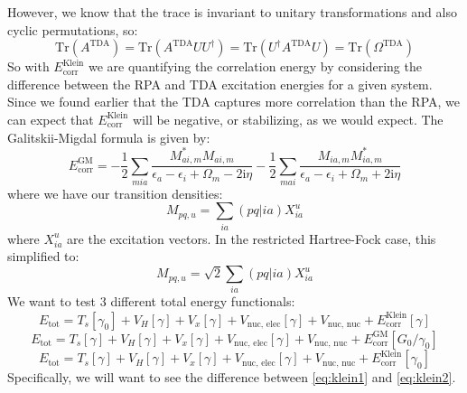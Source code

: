 \documentclass[12pt]{article}
\begin{document}
However, we know that the trace is invariant to unitary transformations and also cyclic permutations, so:
\begin{equation}
    \text{Tr} (A^{\text{TDA}}) = \text{Tr} (A^{\text{TDA}} UU^{\dagger}) = \text{Tr} (U^{\dagger} A^{\text{TDA}} U) = \text{Tr} (\Omega ^{\text{TDA}})
\end{equation}
So with $E_{\text{corr}}^{\text{Klein}}$ we are quantifying the correlation energy by considering the difference between the RPA and TDA excitation energies for a given system. Since we found earlier that the TDA captures more correlation than the RPA, we can expect that $E_{\text{corr}}^{\text{Klein}}$ will be negative, or stabilizing, as we would expect.
The Galitskii-Migdal formula is given by:
\begin{equation}
    E_{\text{corr}} ^{\text{GM}} =-\frac{1}{2} \sum_{m i a} \frac{M_{a i, m}^* M_{a i, m}}{\epsilon_a-\epsilon_i+\Omega_m-2 \mathrm{i} \eta}-\frac{1}{2} \sum_{m a i} \frac{M_{i a, m} M_{i a, m}^*}{\epsilon_a-\epsilon_i+\Omega_m+2 \mathrm{i} \eta}
\end{equation}
where we have our transition densities:
\begin{equation}
    M_{pq,u} = \sum_{ia} (pq|ia) X_{ia}^u
\end{equation}
where $X_{ia}^u$ are the excitation vectors. In the restricted Hartree-Fock case, this simplified to:
\begin{equation}
    M_{pq,u} = \sqrt{2} \sum_{ia} (pq|ia) X_{ia}^u
\end{equation}
We want to test 3 different total energy functionals:
\begin{equation}
    E_{\text{tot}} = T_s [\gamma _{0}] + V_H [\gamma ] + V_x [\gamma ] + V_{\text{nuc, elec}} [\gamma ] + V_{\text{nuc, nuc}} + E_{\text{corr}} ^{\text{Klein}}[\gamma ]
\label{eq:klein1}
\end{equation}
\begin{equation}
    E_{\text{tot}} = T_s [\gamma ] + V_H [\gamma ] + V_x [\gamma ] + V_{\text{nuc, elec}} [\gamma ] + V_{\text{nuc, nuc}} + E_{\text{corr}} ^{\text{GM}}[G_0/\gamma _0]
\end{equation}
\begin{equation}
    E_{\text{tot}} = T_s [\gamma ] + V_H [\gamma ] + V_x [\gamma ] + V_{\text{nuc, elec}} [\gamma ] + V_{\text{nuc, nuc}} + E_{\text{corr}} ^{\text{Klein}}[\gamma_0]
\label{eq:klein2}
\end{equation}
Specifically, we will want to see the difference between \ref{eq:klein1} and \ref{eq:klein2}. 
\end{document}
